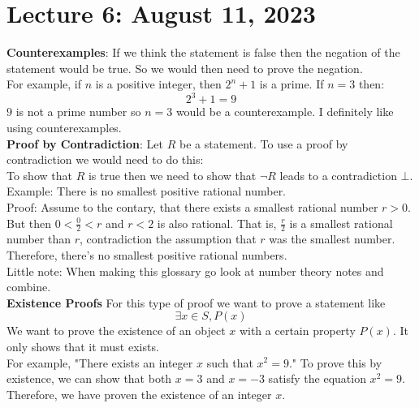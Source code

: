 \documentclass{article}
\begin{document}
\section{Lecture 6: August 11, 2023}
\textbf{Counterexamples}: If we think the statement is false then the negation of the statement would be true. So we would then need to prove the negation.\\
For example, if \(n\) is a positive integer, then \(2^n+1\) is a prime. If \(n = 3\) then:
\[2^3+1 = 9\]
\(9\) is not a prime number so \(n = 3\) would be a counterexample. I definitely like using counterexamples.\\
\textbf{Proof by Contradiction}: Let \(R\) be a statement. To use a proof by contradiction we would need to do this:\\
To show that \(R\) is true then we need to show that \(\neg R\) leads to a contradiction \(\bot\).\\
Example: There is no smallest positive rational number.\\
Proof: Assume to the contary, that there exists a smallest rational number \(r > 0\). But then \(0 < \frac{0}{2} < r\) and \(r < 2\) is also rational. That is, \(\frac{r}{2}\) is a smallest rational number than \(r\), contradiction the assumption that \(r\) was the smallest number. Therefore, there's no smallest positive rational numbers.
\\Little note: When making this glossary go look at number theory notes and combine.\\
\textbf{Existence Proofs} For this type of proof we want to prove a statement like 
\[\exists x \in S, P(x)\]
We want to prove the existence of an object \(x\) with a certain property \(P(x)\). It only shows that it must exists.\\
For example, "There exists an integer \(x\) such that \(x^2 = 9\)." To prove this by existence, we can show that both \(x = 3\) and \(x = -3\) satisfy the equation \(x^2 = 9\). Therefore, we have proven the existence of an integer \(x\).
\end{document}

